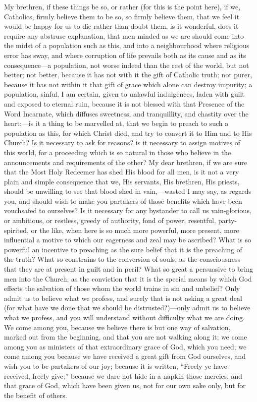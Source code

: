 My brethren, if these things be so, or rather (for this is the
point here), if we, Catholics, firmly believe them to be so, so firmly
believe them, that we feel it would be happy for us to die rather than
doubt them, is it wonderful, does it require any abstruse explanation,
that men minded as we are should come into the midst of a population
such as this, and into a neighbourhood where religious error has sway,
and where corruption of life prevails both as its cause and as its
consequence—a population, not worse indeed than the rest of the
world, but not better; not better, because it has not with it the gift
of Catholic truth; not purer, because it has not within it that gift
of grace which alone can destroy impurity; a population, sinful, I am
certain, given to unlawful indulgences, laden with guilt and exposed
to eternal ruin, because it is not blessed with that Presence of the
Word Incarnate, which diffuses sweetness, and tranquillity, and
chastity over the heart;—is it a thing to be marvelled at, that we
begin to preach to such a population as this, for which Christ died,
and try to convert it to Him and to His Church? Is it necessary to ask
for reasons? is it necessary to assign motives of this world, for a
proceeding which is so natural in those who believe in the
announcements and requirements of the other? My dear brethren, if we
are sure that the Most Holy Redeemer has shed His blood for all men,
is it not a very plain and simple consequence that we, His servants,
His brethren, His priests, should be unwilling to see that blood shed
in vain,—wasted I may say, as regards you, and should wish to make
you partakers of those benefits which have been vouchsafed to
ourselves? Is it necessary for any bystander to call us vain-glorious,
or ambitious, or restless, greedy of authority, fond of power,
resentful, party-spirited, or the like, when here is so much more
powerful, more present, more influential a motive to which our
eagerness and zeal may be ascribed? What is so powerful an incentive
to preaching as the sure belief that it is the preaching of the truth?
What so constrains to the conversion of souls, as the consciousness
that they are at present in guilt and in peril? What so great a
persuasive to bring men into the Church, as the conviction that it is
the special means by which God effects the salvation of those whom the
world trains in sin and unbelief? Only admit us to believe what we
profess, and surely that is not asking a great deal (for what have we
done that we should be distrusted?)—only admit us to believe what we
profess, and you will understand without difficulty what we are doing.
We come among you, because we believe there is but one way of
salvation, marked out from the beginning, and that you are not walking
along it; we come among you as ministers of that extraordinary grace
of God, which you need; we come among you because we have received a
great gift from God ourselves, and wish you to be partakers of our
joy; because it is written, ``Freely ye have received, freely
give;'' because we dare not hide in a napkin those mercies, and
that grace of God, which have been given us, not for our own sake
only, but for the benefit of others.

